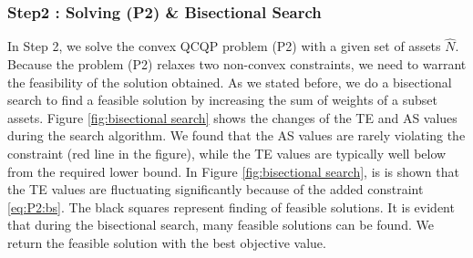 \documentclass[11pt]{article}
\begin{document}
	
	
	
	
	\subsubsection{Step2 : Solving (P2) \& Bisectional Search }
	
	In Step 2, we solve the convex QCQP problem (P2) with a given set of assets $\hat{N}$. Because the problem (P2) relaxes two non-convex constraints, we need to warrant the feasibility of the solution obtained. As we stated before, we do a bisectional search to find a feasible solution by increasing the sum of weights of a subset assets. Figure \ref{fig:bisectional search} shows the changes of the TE and AS values during the search algorithm. We found that the AS values are rarely violating the constraint (red line in the figure), while the TE values are typically well below from the required lower bound. In Figure \ref{fig:bisectional search}, is is shown that the TE values are fluctuating significantly because of the added constraint \eqref{eq:P2:bs}. The black squares represent finding of feasible solutions. It is evident that during the bisectional search, many feasible solutions can be found. We return the feasible solution with the best objective value.
	
\end{document}
